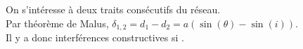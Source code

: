 ﻿\documentclass[a4paper]{article}
\begin{document}
\pagestyle{fancy}
\fancyhf{}
\setlength{\headheight}{15pt}

\begin{center}
	\large{}
\end{center}


On s'intéresse à deux traits consécutifs du réseau.\\
Par théorème de Malus, \( \delta_{1 ,2} = d_1 - d_2 = a(\sin(\theta) -\sin(i))\).\\
Il y a donc interférences constructives si .
\end{document}
